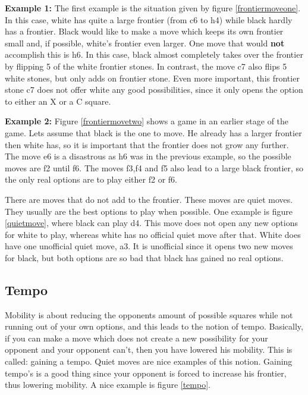 \documentclass[12pt,twoside]{report}
\begin{document}
\begin{floatingfigure}{4cm}
\frontiermoveone
\end{floatingfigure}
\textbf{Example 1: }The first example is the situation given by
figure \ref{frontiermoveone}. In this case, white has quite a
large frontier (from c6 to h4) while black hardly has a frontier.
Black would like to make a move which keeps its own frontier small
and, if possible, white's frontier even larger. One move that
would \textbf{not} accomplish this is h6. In this case, black
almost completely takes over the frontier by flipping 5 of the white
frontier stones. In contrast, the move c7 also flips 5 white
stones, but only adds on frontier stone. Even more important,
this frontier stone c7 does not offer white any good
possibilities, since it only opens the option to either an X or a
C square.
\newpage
\begin{figure}[h]
\frontiermovetwo
\end{figure}
\textbf{Example 2: }
Figure \ref{frontiermovetwo} shows a game in an earlier stage of
the game. Lets assume that black is the one to move. He already
has a larger frontier then white has, so it is important that the
frontier does not grow any further. The move e6 is a disastrous as
h6 was in the previous example, so the possible moves are f2 until
f6. The moves f3,f4 and f5 also lead to a large black frontier, so the only real options are to
play either f2 or f6.

There are moves that do not add to the frontier. These moves are
quiet moves. They usually are the best options to play when
possible. One example is figure \ref{quietmove}, where black can
play d4. This move does not open any new options for white to
play, whereas white has no official quiet move after that. White
does have one unofficial quiet move, a3. It is unofficial since it
opens two new moves for black, but both options are so bad that
black has gained no real options.
\begin{figure}[h]
\quietmove
\end{figure}

\subsection{Tempo}
Mobility is about reducing the opponents amount of possible
squares while not running out of your own options, and this leads
to the notion of tempo. Basically, if you can make a move which
does not create a new possibility for your opponent and your opponent can't, then you have
lowered his mobility. This is called: gaining a tempo. Quiet moves
are nice examples of this notion. Gaining tempo's is a good thing
since your opponent is forced to increase his frontier, thus
lowering mobility. A nice example is figure \ref{tempo}.
\begin{figure}[ht]
\tempo
\end{figure}
\end{document}
